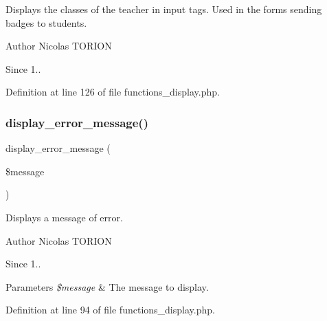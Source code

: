 Displays the classes of the teacher in input tags. Used in the forms sending badges to students.

\begin{DoxyAuthor}{Author}
Nicolas T\+O\+R\+I\+ON 
\end{DoxyAuthor}
\begin{DoxySince}{Since}
1.. 
\end{DoxySince}


Definition at line 126 of file functions\+\_\+display.\+php.

\mbox{\label{functions__display_8php_ae2ac52dd805785434ad86413e9215d73}} 
\subsubsection{\texorpdfstring{display\+\_\+error\+\_\+message()}{display\_error\_message()}}
{\footnotesize\ttfamily display\+\_\+error\+\_\+message (\begin{DoxyParamCaption}\item[{}]{\$message }\end{DoxyParamCaption})}

Displays a message of error.

\begin{DoxyAuthor}{Author}
Nicolas T\+O\+R\+I\+ON 
\end{DoxyAuthor}
\begin{DoxySince}{Since}
1.. 
\end{DoxySince}

\begin{DoxyParams}{Parameters}
{\em \$message} & The message to display. \\
\hline
\end{DoxyParams}


Definition at line 94 of file functions\+\_\+display.\+php.

\mbox{\label{functions__display_8php_a25ff2818847c3022484d4f99ec37f49e}} 
